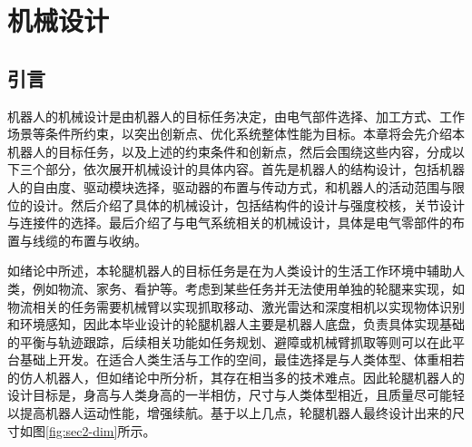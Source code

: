 \section{机械设计}

\subsection{引言}

机器人的机械设计是由机器人的目标任务决定，由电气部件选择、加工方式、工作场景等条件所约束，以突出创新点、优化系统整体性能为目标。本章将会先介绍本机器人的目标任务，以及上述的约束条件和创新点，然后会围绕这些内容，分成以下三个部分，依次展开机械设计的具体内容。首先是机器人的结构设计，包括机器人的自由度、驱动模块选择，驱动器的布置与传动方式，和机器人的活动范围与限位的设计。然后介绍了具体的机械设计，包括结构件的设计与强度校核，关节设计与连接件的选择。最后介绍了与电气系统相关的机械设计，具体是电气零部件的布置与线缆的布置与收纳。



如绪论中所述，本轮腿机器人的目标任务是在为人类设计的生活工作环境中辅助人类，例如物流、家务、看护等。考虑到某些任务并无法使用单独的轮腿来实现，如物流相关的任务需要机械臂以实现抓取移动、激光雷达和深度相机以实现物体识别和环境感知，因此本毕业设计的轮腿机器人主要是机器人底盘，负责具体实现基础的平衡与轨迹跟踪，后续相关功能如任务规划、避障或机械臂抓取等则可以在此平台基础上开发。在适合人类生活与工作的空间，最佳选择是与人类体型、体重相若的仿人机器人，但如绪论中所分析，其存在相当多的技术难点。因此轮腿机器人的设计目标是，身高与人类身高的一半相仿，尺寸与人类体型相近，且质量尽可能轻以提高机器人运动性能，增强续航。基于以上几点，轮腿机器人最终设计出来的尺寸如图\ref{fig:sec2-dim}所示。


